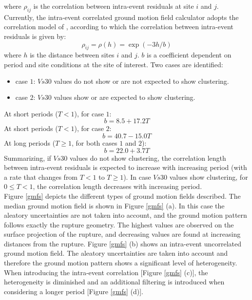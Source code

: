 where $\rho_{ij}$ is the correlation between intra-event residuals at site $i$ and $j$.\\
Currently, the intra-event correlated ground motion field calculator adopts the correlation model of \citet{jayaram2009}, according to which the correlation between intra-event residuals is given by:
 \begin{equation}
 \rho_{ij} = \rho(h) = \exp(-3h/b)
 \end{equation}
 where $h$ is the distance between sites $i$ and $j$. $b$ is a coefficient dependent on period and site conditions at the site of interest. Two cases are identified:
 \begin{itemize}
 \item case $1$:  $Vs30$ values do not show or are not expected to show clustering.
 \item case $2$: $Vs30$ values show or are expected to show clustering.
 \end{itemize}
At short periods ($T<1$), for case $1$:
\begin{equation}
b = 8.5 + 17.2T
\end{equation}
At short periods ($T<1$), for case $2$:
\begin{equation}
b = 40.7 - 15.0T
\end{equation}
At long periods ($T\geq1$, for both cases $1$ and $2$):
\begin{equation}
b = 22.0 + 3.7T
\end{equation}
Summarizing, if $Vs30$ values do not show clustering, the correlation length between intra-event residuals is expected to increase with increasing period (with a rate that changes from $T<1$ to $T\geq1$). In case $Vs30$ values show clustering, for  $0\leq T<1$, the correlation length decreases with increasing period.\\
Figure \ref{gmfs} depicts the different types of ground motion fields described. The median ground motion field is shown in Figure \ref{gmfs} (a). In this case the aleatory uncertainties are not taken into account, and the ground motion pattern follows exactly the rupture geometry. The highest values are observed on the surface projection of the rupture, and decreasing values are found at increasing distances from the rupture. Figure \ref{gmfs} (b) shows an intra-event uncorrelated ground motion field. The aleatory uncertainties are taken into account and therefore the ground motion pattern shows a significant level of heterogeneity. When introducing the intra-event correlation [Figure \ref{gmfs} (c)], the heterogeneity is diminished and an additional filtering is introduced when considering a longer period [Figure \ref{gmfs} (d)].\\
